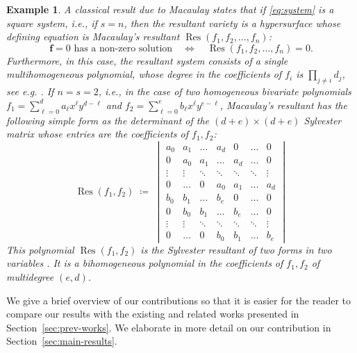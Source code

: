 \documentclass[11pt,a4paper]{article}
\newtheorem{example}[theorem]{Example}\AddToHook{env/example/begin}{\crefalias{theorem}{example}}
\numberwithin{equation}{section}
\newcommand{\ff}{\ensuremath{\boldsymbol{f}}}
\DeclareMathOperator{\Res}{Res}
\begin{document}
\begin{example}
\label{ex:macaulay}
A classical result due to Macaulay \cite{Macaulay-02,Macaulay-16} states that if \eqref{eq:system} is a square system, i.e., if $s=n$, then the resultant variety is a hypersurface whose defining equation is \emph{Macaulay's resultant} $\Res(f_1,f_2,\dots,f_n)$: \[
 \ff = 0 \text{ has a non-zero solution}\quad\iff\quad\Res(f_1,f_2,\dots,f_{n}) = 0.
\] 
Furthermore, in this case, the resultant system consists of a single multihomogeneous polynomial, whose degree in the coefficients of $f_i$ is $\prod_{j\neq i} d_j$, see e.g. \cite[Theorem~(3.1)]{Cox-Little-Oshea-05}.
If $n=s=2$, i.e., in the case of two homogeneous bivariate polynomials $f_1 = \sum_{\ell=0}^d a_{\ell} x^\ell y^{d-\ell}$ and $f_2 = \sum_{\ell=0}^e b_{\ell} x^{\ell} y^{e-\ell}$, 
Macaulay's resultant has the following simple form as the determinant of the $(d+e)\times (d+e)$ \emph{Sylvester matrix} whose entries are the coefficients of $f_1,f_2$: \[
\Res(f_1,f_2) \;\coloneqq \;\begin{vmatrix}
    a_0 & a_1 & \dots & a_d & 0 & \dots & 0\\
    0 & a_0 & a_1 & \dots  & a_d & \dots & 0\\
    \vdots & \vdots & \ddots & \ddots & \ddots & \ddots & \vdots\\
    0 & \dots & 0 & a_0 & a_1 & \dots & a_d\\
    b_0 & b_1 & \dots & b_e & 0 & \dots & 0\\
    0 & b_0 & b_1 & \dots  & b_e & \dots & 0\\
    \vdots & \vdots & \ddots & \ddots & \ddots & \ddots & \vdots\\
    0 & \dots & 0 & b_0 & b_1 & \dots & b_e
\end{vmatrix}
\]
This polynomial $\Res(f_1,f_2)$ is the \emph{Sylvester resultant} of two forms in two variables \cite{Sylvester-40}.
It is a bihomogeneous polynomial in the coefficients of $f_1,f_2$ of multidegree $(e,d)$.
\end{example}

We give a brief overview of our contributions so that it is easier for the reader to compare our results with the existing and related works presented in Section~\ref{sec:prev-works}.
We elaborate in more detail on our contribution in Section~\ref{sec:main-results}.
 
\end{document}
